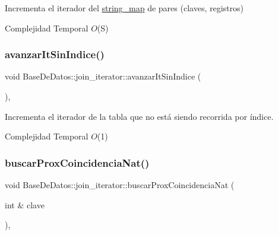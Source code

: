 Incrementa el iterador del \mbox{\hyperlink{classstring__map}{string\+\_\+map}} de pares (claves, registros) 


\begin{DoxyDescription}
\item[Complejidad Temporal]$O$(S)
\end{DoxyDescription}\mbox{\label{classBaseDeDatos_1_1join__iterator_a702f207cc0e5de5f81a20b244ae289a1}} 
\subsubsection{\texorpdfstring{avanzar\+It\+Sin\+Indice()}{avanzarItSinIndice()}}
{\footnotesize\ttfamily void Base\+De\+Datos\+::join\+\_\+iterator\+::avanzar\+It\+Sin\+Indice (\begin{DoxyParamCaption}{ }\end{DoxyParamCaption})\hspace{0.3cm}{\ttfamily [inline]}, {\ttfamily [private]}}



Incrementa el iterador de la tabla que no está siendo recorrida por índice. 


\begin{DoxyDescription}
\item[Complejidad Temporal]$O$(1)
\end{DoxyDescription}\mbox{\label{classBaseDeDatos_1_1join__iterator_aaadfa593ce2a3e0e2ab80dca1925c7cc}} 
\subsubsection{\texorpdfstring{buscar\+Prox\+Coincidencia\+Nat()}{buscarProxCoincidenciaNat()}}
{\footnotesize\ttfamily void Base\+De\+Datos\+::join\+\_\+iterator\+::buscar\+Prox\+Coincidencia\+Nat (\begin{DoxyParamCaption}\item[{int \&}]{clave }\end{DoxyParamCaption})\hspace{0.3cm}{\ttfamily [inline]}, {\ttfamily [private]}}



